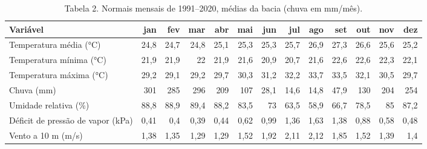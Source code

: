 \begin{table}
\caption{Tabela 2. Normais mensais de 1991–2020, médias da bacia (chuva em mm/mês).}
\label{tab:03_clima:xingu:normais_mensais}
\begin{tabular}{lrrrrrrrrrrrr}
\toprule
Variável & jan & fev & mar & abr & mai & jun & jul & ago & set & out & nov & dez \\
\midrule
Temperatura média (°C) & 24,8 & 24,7 & 24,8 & 25,1 & 25,3 & 25,3 & 25,7 & 26,9 & 27,3 & 26,6 & 25,6 & 25,2 \\
Temperatura mínima (°C) & 21,9 & 21,9 & 22 & 21,9 & 21,6 & 20,9 & 20,7 & 21,6 & 22,6 & 22,6 & 22,3 & 22,1 \\
Temperatura máxima (°C) & 29,2 & 29,1 & 29,2 & 29,7 & 30,3 & 31,2 & 32,2 & 33,7 & 33,5 & 32,1 & 30,5 & 29,7 \\
Chuva (mm) & 301 & 285 & 296 & 209 & 107 & 28,1 & 14,6 & 14,8 & 47,9 & 130 & 204 & 254 \\
Umidade relativa (\%) & 88,8 & 88,9 & 89,4 & 88,2 & 83,5 & 73 & 63,5 & 58,9 & 66,7 & 78,5 & 85 & 87,2 \\
Déficit de pressão de vapor (kPa) & 0,41 & 0,4 & 0,39 & 0,44 & 0,62 & 0,99 & 1,36 & 1,63 & 1,38 & 0,88 & 0,58 & 0,48 \\
Vento a 10 m (m/s) & 1,38 & 1,35 & 1,29 & 1,29 & 1,52 & 1,92 & 2,11 & 2,12 & 1,85 & 1,52 & 1,39 & 1,4 \\
\bottomrule
\end{tabular}
\end{table}
